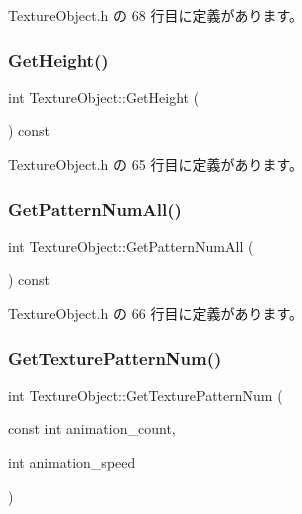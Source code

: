  Texture\+Object.\+h の 68 行目に定義があります。

\mbox{\label{class_texture_object_af312bd8d8cdb31918a00e1fe096c26e0}} 
\subsubsection{\texorpdfstring{Get\+Height()}{GetHeight()}}
{\footnotesize\ttfamily int Texture\+Object\+::\+Get\+Height (\begin{DoxyParamCaption}{ }\end{DoxyParamCaption}) const\hspace{0.3cm}{\ttfamily [inline]}}



 Texture\+Object.\+h の 65 行目に定義があります。

\mbox{\label{class_texture_object_a7d6efe951d81051ed4c763db1208aa40}} 
\subsubsection{\texorpdfstring{Get\+Pattern\+Num\+All()}{GetPatternNumAll()}}
{\footnotesize\ttfamily int Texture\+Object\+::\+Get\+Pattern\+Num\+All (\begin{DoxyParamCaption}{ }\end{DoxyParamCaption}) const\hspace{0.3cm}{\ttfamily [inline]}}



 Texture\+Object.\+h の 66 行目に定義があります。

\mbox{\label{class_texture_object_a5bfee4b09a77e078a51117363a6ede34}} 
\subsubsection{\texorpdfstring{Get\+Texture\+Pattern\+Num()}{GetTexturePatternNum()}}
{\footnotesize\ttfamily int Texture\+Object\+::\+Get\+Texture\+Pattern\+Num (\begin{DoxyParamCaption}\item[{const int}]{animation\+\_\+count,  }\item[{int}]{animation\+\_\+speed }\end{DoxyParamCaption})}



